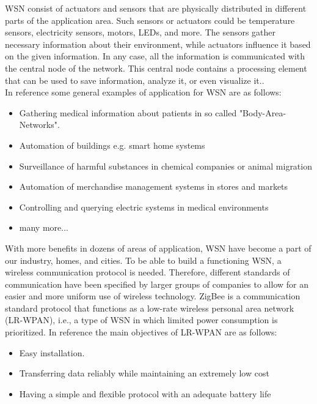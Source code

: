 \documentclass[conference]{IEEEtran}
\begin{document}
WSN consist of actuators and sensors that are physically distributed in different parts of the application area. Such sensors or actuators could be temperature sensors, electricity sensors, motors, LEDs, and more. The sensors gather necessary information about their environment, while actuators influence it based on the given information. In any case, all the information is communicated with the central node of the network. This central node contains a processing element that can be used to save information, analyze it, or even visualize it.\cite{DrahtlosZigbee}.\\

In reference \cite{DrahtlosZigbee} some general examples of application for WSN are as follows:

\begin{itemize}
    \item Gathering medical information about patients in so called "Body-Area-Networks"\cite{DrahtlosZigbee}.
    \item Automation of buildings e.g. smart home systems
    \item Surveillance of harmful substances in chemical companies or animal migration
    \item Automation of merchandise management systems in stores and markets
    \item Controlling and querying electric systems in medical environments
    \item many more...
\end{itemize}

With more benefits in dozens of areas of application, WSN have become a part of our industry, homes, and cities. To be able to build a functioning WSN, a wireless communication protocol is needed. Therefore, different standards of communication have been specified by larger groups of companies to allow for an easier and more uniform use of wireless technology. ZigBee is a communication standard protocol that functions as a low-rate wireless personal area network (LR-WPAN), i.e., a type of WSN in which limited power consumption is prioritized\cite{2020Standard}. In reference \cite{2020Standard} the main objectives of LR-WPAN are as follows:

\begin{itemize}
    \item Easy installation.
    \item Transferring data reliably while maintaining an extremely low cost
    \item Having a simple and flexible protocol with an adequate battery life
\end{itemize}
\end{document}
